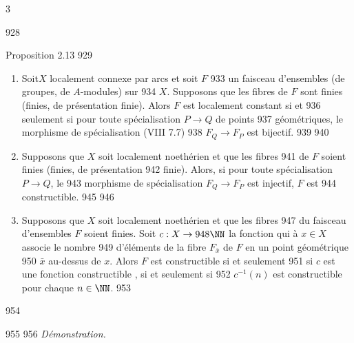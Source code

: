 3	\documentclass[10pt]{../fichiers-configuration-latex/smfart}
\begin{document}
   928	\begin{enonce*}{Proposition 2.13}
   929	\begin{enumerate}
   930	\renewcommand{\theenumi}{\roman{enumi}}
   931	\renewcommand{\labelenumi}{(\theenumi)}
   932	\item Soit\pageoriginale $X$ localement connexe par arcs et soit $F$
   933	un faisceau d'ensembles (\resp de groupes, \resp de $A$-modules) sur
   934	$X$. Supposons que les fibres de $F$ sont finies (\resp finies, 	de présentation finie). Alors $F$ est localement constant si et
   936	seulement si pour toute spécialisation $P\rightarrow Q$ de points
   937	géométriques, le morphisme de spécialisation {\rm (VIII 7.7)}
   938	$F_Q\rightarrow F_P$ est bijectif.
   939	
   940	\item Supposons que $X$ soit localement noethérien et que les fibres
   941	de $F$ soient finies (\resp finies, \resp de présentation
   942	finie). Alors, si pour toute spécialisation $P\rightarrow Q$, le
   943	morphisme de spécialisation $F_Q\rightarrow F_P$ est injectif, $F$ est
   944	constructible.
   945	
   946	\item Supposons que $X$ soit localement noethérien et que les fibres
   947	du faisceau d'ensembles $F$ soient finies. Soit $c:X\rightarrow
   948	\NN$ la fonction qui à $x\in X$ associe le nombre
   949	d'éléments de la fibre $F_{\bar{x}}$ de $F$ en un point géométrique
   950	$\bar{x}$ au-dessus de $x$. Alors $F$ est constructible si et seulement
   951	si $c$ est une fonction constructible \ie, si et seulement si
   952	$c^{-1}(n)$ est constructible pour chaque $n\in \NN$.
   953	\end{enumerate}
   954	\end{enonce*}
   955	
   956	\emph{Démonstration.}
\end{document}
